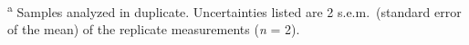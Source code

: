 \begin{table}
\begin{threeparttable}
\begin{tablenotes}
			\item \textsuperscript{a} Samples analyzed in duplicate. Uncertainties listed
			are 2 s.e.m.\ (standard error of the mean) of the replicate measurements
			(\emph{n} = 2).
		
		\end{tablenotes}
	
	\end{threeparttable}

\end{table}